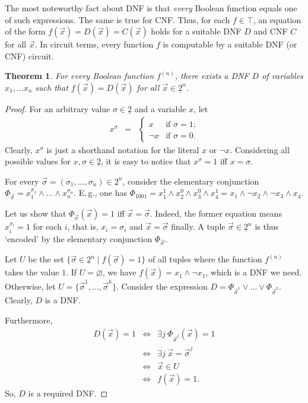 \documentclass[12pt,notitlepage]{article}
\theoremstyle{plain}
\newtheorem{thm}{Theorem}[section]
\theoremstyle{definition}
\theoremstyle{plain}
\newcommand{\void}{\varnothing}
\newcommand{\ul}[1]{\underline{#1}}
\newcommand{\1}{\mathbf{1}}
\newcommand{\0}{\mathbf{0}}
\begin{document}
The most noteworthy fact about DNF is that \emph{every} Boolean function equals one of such expressions. The same is true for CNF. Thus, for each $f \in \top$, an equation of the form $f(\vec x) = D(\vec x) = C(\vec x)$ holds for a suitable DNF $D$ and CNF $C$ for all $\vec x$. In circuit terms, every function $f$ is computable by a suitable DNF (or CNF) circuit.
\begin{thm}\label{bool:dnf}
For every Boolean function $f^{(n)}$, there exists a DNF $D$ of variables $x_1, \ldots x_n$ such that $f(\vec x) = D(\vec x)$ for all $\vec x \in \ul{2}^n$.
\end{thm}
\begin{proof}
For an arbitrary value $\sigma \in \ul{2}$ and a variable $x$, let
$$
\begin{array}{rcl}
x^\sigma&=&\begin{cases}
                  x&\text{if $\sigma = 1$;}\\
		  \neg x&\text{if $\sigma = 0$.}
		 \end{cases}
\end{array}
$$
Clearly, $x^\sigma$ is just a shorthand notation for the literal $x$ or $\neg x$. Considering all possible values for $x, \sigma \in \ul{2}$, it is easy to notice that $x^\sigma = 1$ iff $x = \sigma$.

For every $\vec\sigma = (\sigma_1,\ldots, \sigma_n) \in \ul{2}^n$, consider the elementary conjunction $\Phi_{\vec \sigma} = x^{\sigma_1}_1 \wedge \ldots \wedge x^{\sigma_n}_n$. E.\,g., one has $\Phi_{1001} = x^1_1 \wedge x^0_2 \wedge x^0_3 \wedge x^1_4  = x_1 \wedge \neg x_2 \wedge \neg x_3 \wedge x_4$.

Let us show that $\Phi_{\vec \sigma}(\vec x) = 1$ iff $\vec x = \vec \sigma$. Indeed, the former equation means $x^{\sigma_i}_i = 1$ for each $i$, that is, $x_i = \sigma_i$ and $\vec x = \vec \sigma$ finally. A tuple $\vec \sigma \in \ul{2}^n$ is thus `encoded' by the elementary conjunction $\Phi_{\vec\sigma}$.

Let $U$ be the set $\{ \vec \sigma \in \ul{2}^n \mid f(\vec\sigma) = 1 \}$ of all tuples where the function $f^{(n)}$ takes the value $1$. If $U = \void$, we have $f(\vec x) = x_1 \wedge \neg x_1$, which is a DNF we need. Otherwise, let $U = \{\vec\sigma^1, \ldots,  \vec\sigma^k\}$. Consider the expression $D =  \Phi_{\vec \sigma^1} \vee \ldots \vee \Phi_{\vec \sigma^k}$. Clearly, $D$ is a DNF.

Furthermore, 
$$
\begin{array}{rcl}
D(\vec x) = 1 &\iff& \exists j\: \Phi_{\vec\sigma^j}(\vec x) = 1\\
&\iff& \exists j\: \vec x = \vec\sigma^j\\
&\iff& \vec x \in U\\
&\iff& f(\vec x) = 1.
\end{array}
$$
So, $D$ is a required DNF.
\end{proof}
\end{document}
